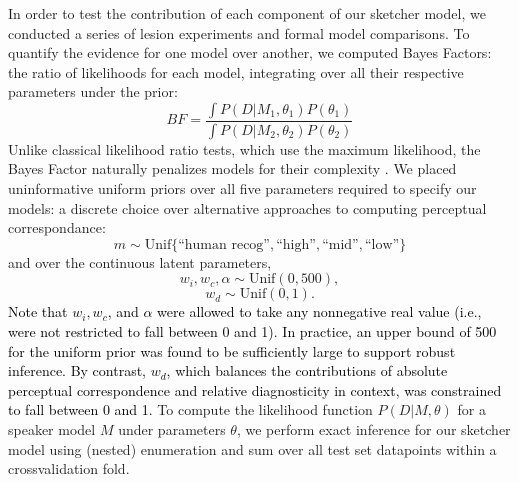 \documentclass{svjour3}
\newcommand{\revised}[1]{\textcolor{Black}{#1}}
\begin{document}
In order to test the contribution of each component of our sketcher model, we conducted a series of lesion experiments and formal model comparisons.
To quantify the evidence for one model over another, we computed Bayes Factors:
the ratio of likelihoods for each model, integrating over all their respective parameters under the prior:
$$BF = \frac{\int P(D | M_1, \theta_1)P(\theta_1)}{\int P(D | M_2, \theta_2)P(\theta_2)}$$
Unlike classical likelihood ratio tests, which use the maximum likelihood, the Bayes Factor naturally penalizes models for their complexity \citep*{wagenmakers2018bayesian,jefferys1992ockham}.
We placed uninformative uniform priors over all five parameters required to specify our models: a discrete choice over alternative approaches to computing perceptual correspondance: 
$$m \sim \textrm{Unif}\{\textrm{``human recog''}, \textrm{``high''}, \textrm{``mid''}, \textrm{``low''}\}$$
and over the continuous latent parameters, 
$$w_i, w_c, \alpha \sim \textrm{Unif}(0, 500),$$ 
$$w_d \sim  \textrm{Unif}(0, 1).$$
\revised{Note that $w_i, w_c$, and $\alpha$ were allowed to take any nonnegative real value (i.e., were not restricted to fall between 0 and 1). In practice, an upper bound of 500 for the uniform prior was found to be sufficiently large to support robust inference. By contrast, $w_d$, which balances the contributions of absolute perceptual correspondence and relative diagnosticity in context, was constrained to fall between 0 and 1.} To compute the likelihood function $P(D | M, \theta)$ for a speaker model $M$ under parameters $\theta$, we perform exact inference for our sketcher model using (nested) enumeration and sum over all test set datapoints within a crossvalidation fold. 

\end{document}
